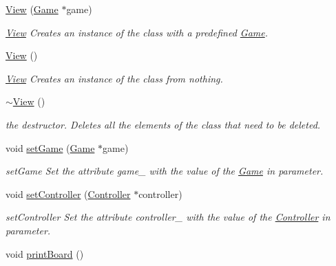 \begin{DoxyCompactItemize}
\item 
\hyperlink{class_view_a7c91b725a55a7843fc628e29d85f53a2}{View} (\hyperlink{class_game}{Game} $\ast$game)
\begin{DoxyCompactList}\small\item\em \hyperlink{class_view}{View} Creates an instance of the class with a predefined \hyperlink{class_game}{Game}. \end{DoxyCompactList}\item 
\mbox{\label{class_view_a44ad60a768422d3fa8fbd7576950080a}} 
\hyperlink{class_view_a44ad60a768422d3fa8fbd7576950080a}{View} ()
\begin{DoxyCompactList}\small\item\em \hyperlink{class_view}{View} Creates an instance of the class from nothing. \end{DoxyCompactList}\item 
\mbox{\label{class_view_ad0dc854db9aabbea98a334dec89f785c}} 
\hyperlink{class_view_ad0dc854db9aabbea98a334dec89f785c}{$\sim$\+View} ()
\begin{DoxyCompactList}\small\item\em the destructor. Deletes all the elements of the class that need to be deleted. \end{DoxyCompactList}\item 
void \hyperlink{class_view_a3f47f684fa69af930056c56e4d559c7d}{set\+Game} (\hyperlink{class_game}{Game} $\ast$game)
\begin{DoxyCompactList}\small\item\em set\+Game Set the attribute game\+\_\+ with the value of the \hyperlink{class_game}{Game} in parameter. \end{DoxyCompactList}\item 
void \hyperlink{class_view_ac837e4c674546a4bfccbb58250a81f6b}{set\+Controller} (\hyperlink{class_controller}{Controller} $\ast$controller)
\begin{DoxyCompactList}\small\item\em set\+Controller Set the attribute controller\+\_\+ with the value of the \hyperlink{class_controller}{Controller} in parameter. \end{DoxyCompactList}\item 
\mbox{\label{class_view_ab5964dab1ea4bf6d23513e21a212f00a}} 
void \hyperlink{class_view_ab5964dab1ea4bf6d23513e21a212f00a}{print\+Board} ()

\end{DoxyCompactItemize}
